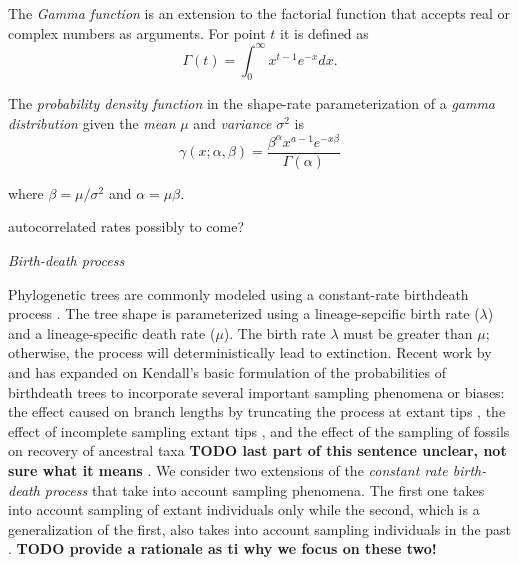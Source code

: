 \documentclass{llncs}
\newcommand{\ejmcomment}[1]{{\color{green} #1}}
\renewcommand{\subsection}[1]{%
\bigskip
\begin{center}
\begin{large}
\normalfont\itshape #1
\end{large}
\end{center}}
\begin{document}
The {\em Gamma function} is an extension to the factorial function that accepts
real or complex numbers as arguments. For point $t$ it is defined as
$$\Gamma(t) = \int_0^\infty x^{t-1} e^{-x} dx.$$

The {\em probability density function} in the shape-rate parameterization of a
{\em gamma distribution} given the {\em mean} $\mu$ and {\em variance} $\sigma^2$ 
is
$$ \gamma(x;\alpha,\beta) = \frac{\beta^{\alpha}x^{a-1}e^{-x\beta}}{\Gamma(\alpha)} $$

where $\beta = \mu / \sigma^2$ and $\alpha = \mu \beta$.

\ejmcomment{autocorrelated rates possibly to come?}

\subsection{Birth-death process}
Phylogenetic trees are commonly modeled using a constant-rate birth\textendash death process \citep{Kendall1948}.
The tree shape is parameterized using a lineage-sepcific birth rate ($\lambda$) and a lineage-specific death rate ($\mu$).
The birth rate $\lambda$ must be greater than $\mu$; otherwise, the process will deterministically lead to extinction.
Recent work by \citet{Gernhard2008} and \citet{Stadler2009, Stadler2010} has expanded on Kendall's basic 
formulation of the probabilities of birth\textendash death trees to incorporate several important sampling phenomena or biases:
the effect caused on branch lengths by truncating the process at extant tips \citep{Gernhard2008},
the effect of incomplete sampling extant tips \citep{Stadler2009}, and the effect of the sampling
of fossils on recovery of ancestral taxa {\bf TODO last part of this sentence unclear, not sure what it means} \citep{Stadler2010}.
We consider two extensions of the {\em constant rate birth-death process}
that take into account sampling phenomena. 
The first one takes into account sampling of extant individuals only
\citep{Stadler2009} while the second, which is a generalization of the first,
also takes into account sampling individuals in the past \citep{Stadler2010}.
{\bf TODO provide a rationale as ti why we focus on these two!} 
\end{document}

